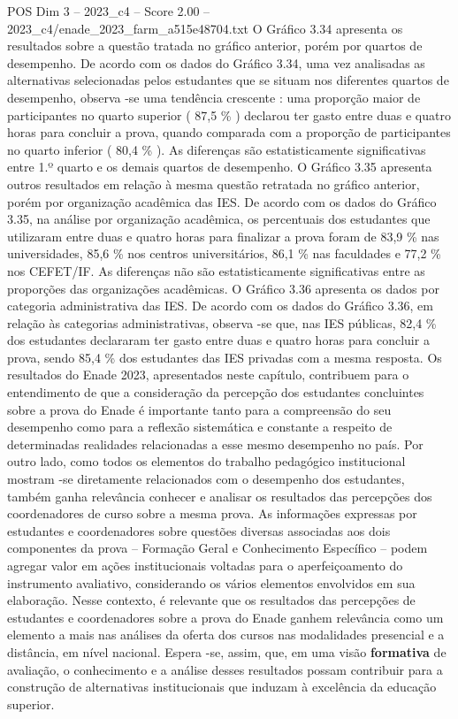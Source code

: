 \begin{textsample}{POS Dim 3 – 2023\_c4 – Score 2.00 – 2023\_c4/enade\_2023\_farm\_a515e48704.txt}
O Gráfico 3.34 apresenta os resultados sobre a questão tratada no gráfico anterior, porém por quartos de desempenho.
De acordo com os dados do Gráfico 3.34, uma vez analisadas as alternativas selecionadas pelos estudantes que se situam nos diferentes quartos de desempenho, observa -se uma tendência crescente : uma proporção maior de participantes no quarto superior ( 87,5 \% ) declarou ter gasto entre duas e quatro horas para concluir a prova, quando comparada com a proporção de participantes no quarto inferior ( 80,4 \% ).
As diferenças são estatisticamente significativas entre 1.º quarto e os demais quartos de desempenho.
O Gráfico 3.35 apresenta outros resultados em relação à mesma questão retratada no gráfico anterior, porém por organização acadêmica das IES.
De acordo com os dados do Gráfico 3.35, na análise por organização acadêmica, os percentuais dos estudantes que utilizaram entre duas e quatro horas para finalizar a prova foram de 83,9 \% nas universidades, 85,6 \% nos centros universitários, 86,1 \% nas faculdades e 77,2 \% nos CEFET/IF.
As diferenças não são estatisticamente significativas entre as proporções das organizações acadêmicas.
O Gráfico 3.36 apresenta os dados por categoria administrativa das IES.
De acordo com os dados do Gráfico 3.36, em relação às categorias administrativas, observa -se que, nas IES públicas, 82,4 \% dos estudantes declararam ter gasto entre duas e quatro horas para concluir a prova, sendo 85,4 \% dos estudantes das IES privadas com a mesma resposta.
Os resultados do Enade 2023, apresentados neste capítulo, contribuem para o entendimento de que a consideração da percepção dos estudantes concluintes sobre a prova do Enade é importante tanto para a compreensão do seu desempenho como para a reflexão sistemática e constante a respeito de determinadas realidades relacionadas a esse mesmo desempenho no país.
Por outro lado, como todos os elementos do trabalho pedagógico institucional mostram -se diretamente relacionados com o desempenho dos estudantes, também ganha relevância conhecer e analisar os resultados das percepções dos coordenadores de curso sobre a mesma prova.
As informações expressas por estudantes e coordenadores sobre questões diversas associadas aos dois componentes da prova – Formação Geral e Conhecimento Específico – podem agregar valor em ações institucionais voltadas para o aperfeiçoamento do instrumento avaliativo, considerando os vários elementos envolvidos em sua elaboração.
Nesse contexto, é relevante que os resultados das percepções de estudantes e coordenadores sobre a prova do Enade ganhem relevância como um elemento a mais nas análises da oferta dos cursos nas modalidades presencial e a distância, em nível nacional.
Espera -se, assim, que, em uma visão \textbf{formativa} de avaliação, o conhecimento e a análise desses resultados possam contribuir para a construção de alternativas institucionais que induzam à excelência da educação superior.

\end{textsample}
